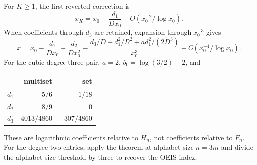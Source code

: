 \documentclass[11pt]{article}
\theoremstyle{definition}\newtheorem{definition}[theorem]{Definition}
\theoremstyle{remark}\newtheorem{remark}[theorem]{Remark}
\numberwithin{equation}{section}
\begin{document}
For $K\ge1$, the first reverted correction is
\[
 x_K=x_0-\frac{d_1}{D x_0}+O(x_0^{-2}/\log x_0).
\]
When coefficients through $d_3$ are retained, expansion through $x_0^{-3}$ gives
\begin{equation}\label{rcw:eq:inverse3}
 x=x_0-\frac{d_1}{D x_0}-\frac{d_2}{D x_0^2}
 -\frac{d_3/D+d_1^2/D^2+a d_1^2/(2D^3)}{x_0^3}
 +O(x_0^{-4}/\log x_0).
\end{equation}
For the cubic degree-three pair, $a=2$, $b_0=\log(3/2)-2$, and
\begin{center}
\begin{tabular}{c rr}
\toprule
 & multiset & set\\
\midrule
$d_1$ & $5/6$ & $-1/18$\\
$d_2$ & $8/9$ & $0$\\
$d_3$ & $4013/4860$ & $-307/4860$\\
\bottomrule
\end{tabular}
\end{center}
These are logarithmic coefficients relative to $H_n$, not coefficients relative to $F_n$. For the degree-two entries, apply the theorem at alphabet size $n=3m$ and divide the alphabet-size threshold by three to recover the OEIS index.
\end{document}
